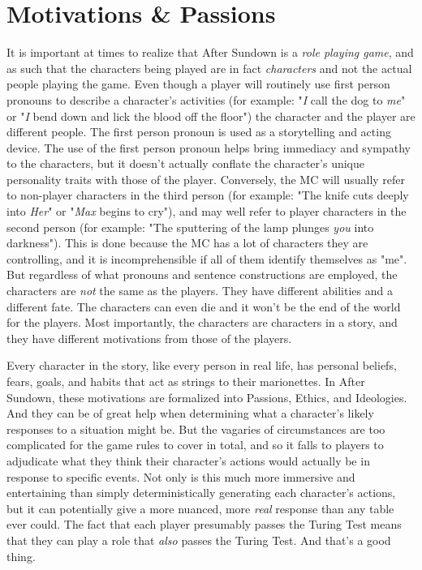 \section{Motivations \& Passions}

It is important at times to realize that After Sundown is a \textit{role playing game}, and as such that the characters being played are in fact \textit{characters} and not the actual people playing the game. Even though a player will routinely use first person pronouns to describe a character's activities (for example: "\textit{I} call the dog to \textit{me}" or "\textit{I} bend down and lick the blood off the floor") the character and the player are different people. The first person pronoun is used as a storytelling and acting device. The use of the first person pronoun helps bring immediacy and sympathy to the characters, but it doesn't actually conflate the character's unique personality traits with those of the player. Conversely, the MC will usually refer to non-player characters in the third person (for example: "The knife cuts deeply into \textit{Her}" or "\textit{Max} begins to cry"), and may well refer to player characters in the second person (for example: "The sputtering of the lamp plunges \textit{you} into darkness"). This is done because the MC has a lot of characters they are controlling, and it is incomprehensible if all of them identify themselves as "me". But regardless of what pronouns and sentence constructions are employed, the characters are \textit{not} the same as the players. They have different abilities and a different fate. The characters can even die and it won't be the end of the world for the players. Most importantly, the characters are characters in a story, and they have different motivations from those of the players.

Every character in the story, like every person in real life, has personal beliefs, fears, goals, and habits that act as strings to their marionettes. In After Sundown, these motivations are formalized into Passions, Ethics, and Ideologies. And they can be of great help when determining what a character's likely responses to a situation might be. But the vagaries of circumstances are too complicated for the game rules to cover in total, and so it falls to players to adjudicate what they think their character's actions would actually be in response to specific events. Not only is this much more immersive and entertaining than simply deterministically generating each character's actions, but it can potentially give a more nuanced, more \textit{real} response than any table ever could. The fact that each player presumably passes the Turing Test means that they can play a role that \textit{also} passes the Turing Test. And that's a good thing.

